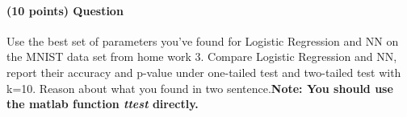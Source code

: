 \documentclass[11pt]{article}
\begin{document}


\paragraph{(10 points) Question} Use the best set of parameters you've found for Logistic Regression and NN on the MNIST data set from home work 3. Compare Logistic Regression and NN, report their accuracy and p-value under one-tailed test and two-tailed test with k=10. Reason about what you found in two sentence.\newline \textbf{Note: You should use the matlab function \textit{ttest} directly. }
 \newline 
\end{document}

